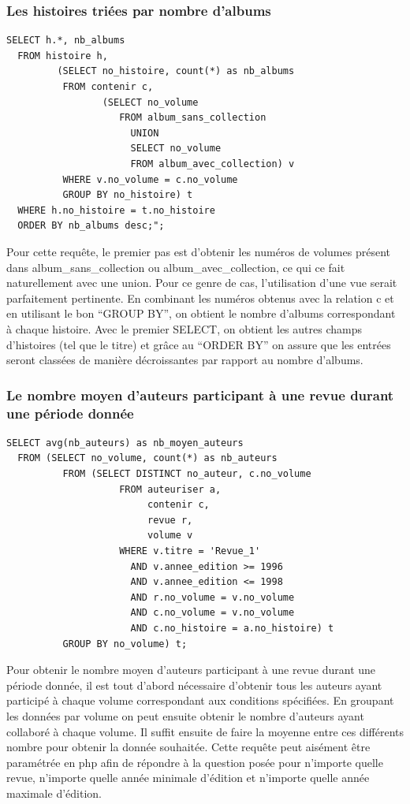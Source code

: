 \documentclass[12pt]{article}
\begin{document}
\subsubsection*{Les histoires triées par nombre d'albums}
\begin{lstlisting}
SELECT h.*, nb_albums
  FROM histoire h,
  		 (SELECT no_histoire, count(*) as nb_albums
          FROM contenir c,
          		 (SELECT no_volume
          		    FROM album_sans_collection
          			  UNION
          			  SELECT no_volume
          			  FROM album_avec_collection) v
          WHERE v.no_volume = c.no_volume
          GROUP BY no_histoire) t
  WHERE h.no_histoire = t.no_histoire
  ORDER BY nb_albums desc;";
\end{lstlisting}
Pour cette requête, le premier pas est d'obtenir les numéros de volumes
présent dans album\_sans\_collection ou album\_avec\_collection, ce qui ce
fait naturellement avec une union. Pour ce genre de cas, l'utilisation d'une
vue serait parfaitement pertinente. En combinant les numéros obtenus avec
la relation c et en utilisant le bon ``GROUP BY'', on obtient le nombre
d'albums correspondant à chaque histoire. Avec le premier SELECT, on obtient
les autres champs d'histoires (tel que le titre) et grâce au ``ORDER BY'' on
assure que les entrées seront classées de manière décroissantes par rapport
au nombre d'albums.

\subsubsection*{Le nombre moyen d'auteurs participant à une revue durant
une période donnée}
\begin{lstlisting}
SELECT avg(nb_auteurs) as nb_moyen_auteurs
  FROM (SELECT no_volume, count(*) as nb_auteurs
          FROM (SELECT DISTINCT no_auteur, c.no_volume
                    FROM auteuriser a,
                         contenir c,
                         revue r,
                         volume v
                    WHERE v.titre = 'Revue_1'
                      AND v.annee_edition >= 1996
                      AND v.annee_edition <= 1998
                      AND r.no_volume = v.no_volume
                      AND c.no_volume = v.no_volume
                      AND c.no_histoire = a.no_histoire) t
          GROUP BY no_volume) t;
\end{lstlisting}
Pour obtenir le nombre moyen d'auteurs participant à une revue durant une
période donnée, il est tout d'abord nécessaire d'obtenir tous les auteurs
ayant participé à chaque volume correspondant aux conditions spécifiées. En
groupant les données par volume on peut ensuite obtenir le nombre d'auteurs
ayant collaboré à chaque volume. Il suffit ensuite de faire la moyenne entre
ces différents nombre pour obtenir la donnée souhaitée. Cette requête peut
aisément être paramétrée en php afin de répondre à la question posée pour
n'importe quelle revue, n'importe quelle année minimale d'édition et
n'importe quelle année maximale d'édition.
\end{document}
